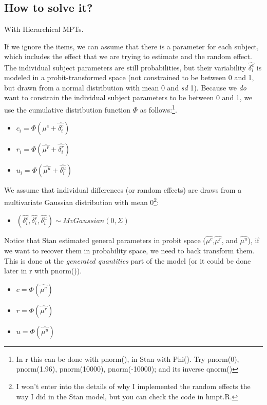 \documentclass[10pt,a4paper]{article}
\begin{document}
\subsection{How to solve it?}

With Hierarchical MPTs.

If we ignore the items, we can assume that there is a parameter for each subject, which includes the effect that we are trying to estimate and the random effect. The individual subject parameters are still probabilities, but their variability $\hat{\delta^c_i}$ is modeled in a probit-transformed space (not constrained to be between 0 and 1, but drawn from a normal distribution with mean 0 and \emph{sd} 1). Because we \emph{do} want to constrain the individual subject parameters to be between 0 and 1, we use the cumulative distribution function $\Phi$ as follows:\footnote{In r this can be done with pnorm(), in Stan with Phi(). Try pnorm(0), pnorm(1.96), pnorm(10000), pnorm(-10000); and its inverse qnorm() }.

\begin{itemize}
\item $c_i  = \Phi(\hat{\mu^c} + \hat{\delta^c_i})$

\item $r_i  = \Phi(\hat{\mu^r} + \hat{\delta^r_i})$

\item $u_i  = \Phi(\hat{\mu^u} + \hat{\delta^u_i})$
\end{itemize}

We assume that individual differences (or random effects) are draws from a multivariate Gaussian distribution with mean 0\footnote{I won't enter into the details of why I implemented the random effects the way I did in the Stan model, but you can check the code in hmpt.R.}:
\begin{itemize}
\item $(\hat{\delta^c_i},\hat{\delta^r_i},\hat{\delta^u_i})\sim MvGaussian(0,\Sigma)$
\end{itemize}

Notice that Stan estimated general parameters in probit space ($\hat{\mu^c}$,$\hat{\mu^r}$, and $\hat{\mu^u}$), if we want to recover them in probability space, we need to back transform them. This is done at the \emph{generated quantities} part of the model (or it could be done later in r with pnorm()).

\begin{itemize}
\item $c  = \Phi(\hat{\mu^c})$

\item $r  = \Phi(\hat{\mu^r})$

\item $u  = \Phi(\hat{\mu^u})$
\end{itemize}
\end{document}
